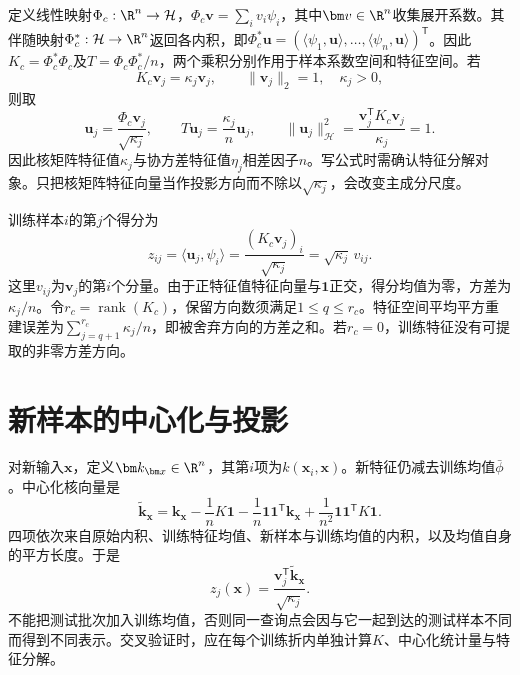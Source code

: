 定义线性映射$\Phi_c:\R^n\to\mathcal H$，$\Phi_c\bm v=\sum_i v_i\psi_i$，其中$\bm v\in\R^n$收集展开系数。其伴随映射$\Phi_c^*:\mathcal H\to\R^n$返回各内积，即$\Phi_c^*\bm u=(\langle\psi_1,\bm u\rangle,\ldots,\langle\psi_n,\bm u\rangle)^{\mathsf T}$。因此$K_c=\Phi_c^*\Phi_c$及$T=\Phi_c\Phi_c^*/n$，两个乘积分别作用于样本系数空间和特征空间。若
\begin{equation}
 K_c\bm v_j=\kappa_j\bm v_j,\qquad
 \|\bm v_j\|_2=1,\quad\kappa_j>0,
\end{equation}
则取
\begin{equation}
 \bm u_j=\frac{\Phi_c\bm v_j}{\sqrt{\kappa_j}},\qquad
 T\bm u_j=\frac{\kappa_j}{n}\bm u_j,
 \qquad \|\bm u_j\|_{\mathcal H}^2
 =\frac{\bm v_j^{\mathsf T}K_c\bm v_j}{\kappa_j}=1.
 \label{eq:kpca-normalized-direction}
\end{equation}
因此核矩阵特征值$\kappa_j$与协方差特征值$\eta_j$相差因子$n$。写公式时需确认特征分解对象。只把核矩阵特征向量当作投影方向而不除以$\sqrt{\kappa_j}$，会改变主成分尺度。

训练样本$i$的第$j$个得分为
\begin{equation}
 z_{ij}=\langle\bm u_j,\psi_i\rangle
 =\frac{(K_c\bm v_j)_i}{\sqrt{\kappa_j}}
 =\sqrt{\kappa_j}\,v_{ij}.
 \label{eq:kpca-training-score}
\end{equation}
这里$v_{ij}$为$\bm v_j$的第$i$个分量。由于正特征值特征向量与$\bm1$正交，得分均值为零，方差为$\kappa_j/n$。令$r_c=\operatorname{rank}(K_c)$，保留方向数须满足$1\le q\le r_c$。特征空间平均平方重建误差为$\sum_{j=q+1}^{r_c}\kappa_j/n$，即被舍弃方向的方差之和。若$r_c=0$，训练特征没有可提取的非零方差方向。

\section{新样本的中心化与投影}
对新输入$\bm x$，定义$\bm k_{\bm x}\in\R^n$，其第$i$项为$k(\bm x_i,\bm x)$。新特征仍减去训练均值$\bar\phi$。中心化核向量是
\begin{equation}
 \tilde{\bm k}_{\bm x}=\bm k_{\bm x}-\frac1nK\bm1
 -\frac1n\bm1\bm1^{\mathsf T}\bm k_{\bm x}
 +\frac1{n^2}\bm1\bm1^{\mathsf T}K\bm1.
 \label{eq:kpca-test-centering}
\end{equation}
四项依次来自原始内积、训练特征均值、新样本与训练均值的内积，以及均值自身的平方长度。于是
\begin{equation}
 z_j(\bm x)=\frac{\bm v_j^{\mathsf T}\tilde{\bm k}_{\bm x}}{\sqrt{\kappa_j}}.
 \label{eq:kpca-new-score}
\end{equation}
不能把测试批次加入训练均值，否则同一查询点会因与它一起到达的测试样本不同而得到不同表示。交叉验证时，应在每个训练折内单独计算$K$、中心化统计量与特征分解。

